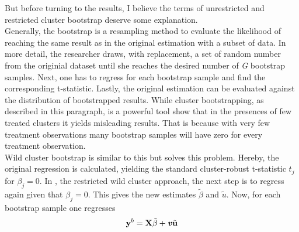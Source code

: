 \documentclass{article}
\begin{document}
But before turning to the results, I believe the terms of unrestricted and restricted cluster bootstrap deserve some explanation. \\
Generally, the bootstrap is a resampling method to evaluate the likelihood of reaching the same result as in the original estimation with a subset of data. In more detail, the researcher draws, with replacement, a set of random number from the originial dataset until she reaches the desired number of \textit{G} bootstrap samples. Next, one has to regress for each bootstrap sample and find the corresponding t-statistic. Lastly, the original estimation can be evaluated against the distribution of bootstrapped results. While cluster bootstrapping, as described in this paragraph, is a powerful tool \cite{mackinnon2017wild} show that in the presences of few treated clusters it yields misleading results. That is because with very few treatment observations many bootstrap samples will have zero for every treatment observation.\\
Wild cluster bootstrap is similar to this but solves this problem. Hereby, the original regression is calculated, yielding the standard cluster-robust t-statistic $ t_j $ for $\beta_j = 0$. In \cite{cameron2008bootstrap}, the restricted wild cluster approach, the next step is to regress again given that $\beta_j = 0$. This gives the new estimates $\tilde{\beta}$ and $\tilde{u}$. Now, for each bootstrap sample one regresses
\begin{align}
\textbf{y}^{b} = \textbf{X} \tilde{\beta} + \textbf{\textit{v}} \tilde{\textbf{u}}
\end{align}
\end{document}
